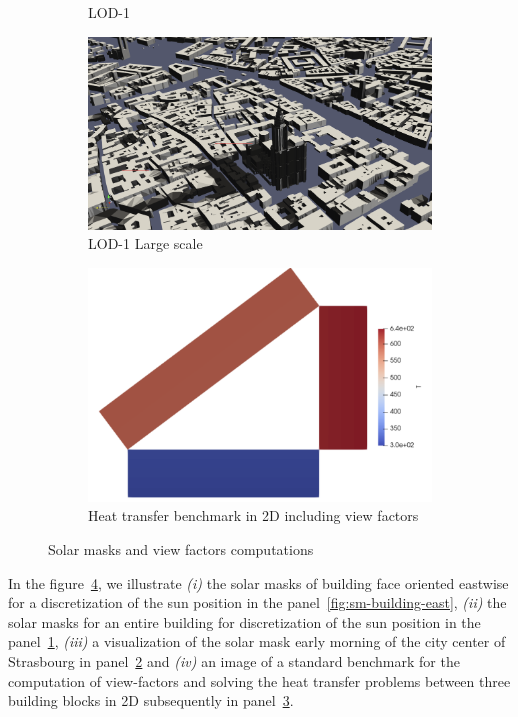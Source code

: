 \documentclass[runningheads]{llncs}
\begin{document}
\begin{figure}[htbp]
\begin{subfigure}{.4\textwidth}
  \caption{LOD-1}
  \label{fig:sm-whole-building}
\end{subfigure}
\begin{subfigure}{.4\textwidth}
  \centering
  \includegraphics[width=\linewidth]{images/solar-masks-strasbourg.png}
  \caption{LOD-1 Large scale}
  \label{fig:sm-strasbourg}
\end{subfigure}
\begin{subfigure}{.4\textwidth}
  \centering
  \includegraphics[width=\linewidth]{images/view-factors-benchmark.png}
  \caption{Heat transfer benchmark in 2D including view factors}
  \label{fig:view-factor}
\end{subfigure}
\caption{Solar masks and view factors computations}
\label{fig:solar-masks-vf}
\end{figure}

In the figure~\ref{fig:solar-masks-vf}, we illustrate \textit{(i)} the solar masks of building face oriented eastwise for a discretization of the sun position in the panel~\ref{fig:sm-building-east}, \textit{(ii)} the solar masks for an entire building for discretization of the sun position in the panel~\ref{fig:sm-whole-building}, \textit{(iii)} a visualization of the solar mask early morning of the city center of Strasbourg in panel~\ref{fig:sm-strasbourg} and \textit{(iv)} an image of a standard benchmark for the computation of view-factors and solving the heat transfer problems between three building blocks in 2D subsequently in panel~\ref{fig:view-factor}.
\end{document}
